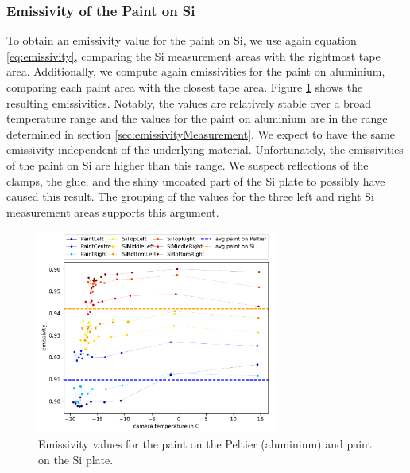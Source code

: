 \subsubsection{Emissivity of the Paint on Si}
To obtain an emissivity value for the paint on Si, we use again equation \ref{eq:emissivity}, comparing the Si measurement areas with the rightmost tape area. Additionally, we compute again emissivities for the paint on aluminium, comparing each paint area with the closest tape area. Figure \ref{fig:emissivitySi} shows the resulting emissivities. Notably, the values are relatively stable over a broad temperature range and the values for the paint on aluminium are in the range determined in section \ref{sec:emissivityMeasurement}. We expect to have the same emissivity independent of the underlying material. Unfortunately, the emissivities of the paint on Si are higher than this range. We suspect reflections of the clamps, the glue, and the shiny uncoated part of the Si plate to possibly have caused this result. The grouping of the values for the three left and right Si measurement areas supports this argument.
\begin{figure}[h!]
	\centering
	\includegraphics[width=0.7\textwidth]{img/emissivitySi.pdf}
	\caption{Emissivity values for the paint on the Peltier (aluminium) and paint on the Si plate.}
	\label{fig:emissivitySi}
\end{figure}

